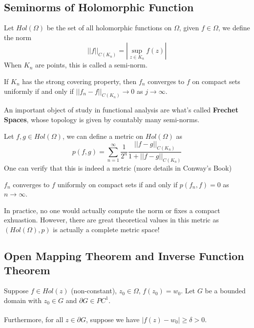 \documentclass{article}
\begin{document}
\subsection{Seminorms of Holomorphic Function}

\begin{definition}
Let $Hol(\Omega)$ be the set of all holomorphic functions on $\Omega$, given $f \in \Omega$, we define the norm
\[||f||_{C(K_n)} = |\sup_{z \in K_n} f(z)|\]
When $K_n$ are points, this is called a semi-norm.
\end{definition}

\begin{proposition}
If $K_n$ has the strong covering property, then $f_n$ converges to $f$ on compact sets uniformly if and only if $||f_n - f||_{C(K_n)} \to 0$ as $j \to \infty$.
\end{proposition}

\begin{remark}
An important object of study in functional analysis are what's called \textbf{Frechet Spaces}, whose topology is given by countably many semi-norms.
\end{remark}

\begin{definition}
Let $f, g \in Hol(\Omega)$, we can define a metric on $Hol(\Omega)$ as
\[p(f, g) = \sum_{n = 1}^\infty \frac{1}{2^n} \frac{||f - g||_{C(K_n)}}{1 + ||f - g||_{C(K_n)}}\]
One can verify that this is indeed a metric (more details in Conway's Book)
\end{definition}

\begin{proposition}
$f_n$ converges to $f$ uniformly on compact sets if and only if $p(f_n, f) = 0$ as $n \to \infty$.
\end{proposition}

\begin{remark}
In practice, no one would actually compute the norm or fixes a compact exhuastion. However, there are great theoretical values in this metric as $(Hol(\Omega), p)$ is actually a complete metric space!
\end{remark}

\subsection{Open Mapping Theorem and Inverse Function Theorem}

Suppose $f \in Hol(z)$ (non-constant), $z_0 \in \Omega$, $f(z_0) = w_0$. Let $G$ be a bounded domain with $z_0 \in G$ and $\partial G \in PC^1$.\\\\
Furthermore, for all $z \in \partial G$, suppose we have $|f(z) - w_0| \geq \delta > 0$.\\
\end{document}
